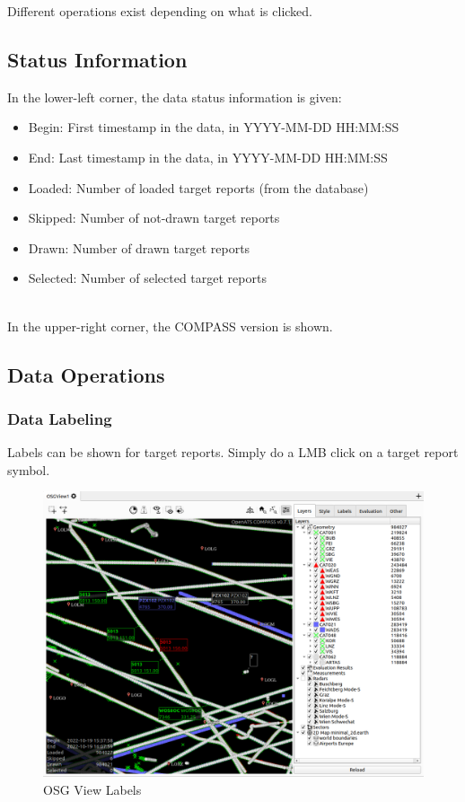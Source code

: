 Different operations exist depending on what is clicked.

\subsection{Status Information}

In the lower-left corner, the data status information is given:

\begin{itemize}
 \item Begin: First timestamp in the data, in YYYY-MM-DD HH:MM:SS
 \item End: Last timestamp in the data, in YYYY-MM-DD HH:MM:SS
 \item Loaded: Number of loaded target reports (from the database)
 \item Skipped: Number of not-drawn target reports
 \item Drawn: Number of drawn target reports
 \item Selected: Number of selected target reports
\end{itemize}
\  \\

In the upper-right corner, the COMPASS version is shown. %

\subsection{Data Operations}

\subsubsection{Data Labeling}

Labels can be shown for target reports. Simply do a LMB click on a target report symbol.

\begin{figure}[H]
    \hspace*{-2.5cm}
    \includegraphics[width=19cm,frame]{figures/osgview_labels.png}
  \caption{OSG View Labels}
\end{figure}

